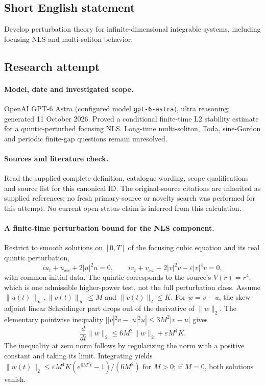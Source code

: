 \documentclass[11pt]{article}
\begin{document}
\subsection{Short English statement}
Develop perturbation theory for infinite-dimensional integrable systems, including focusing NLS and multi-soliton behavior.
\subsection{Research attempt}
\paragraph{Model, date and investigated scope.}
OpenAI GPT-6 Astra (configured model \texttt{gpt-6-astra}), ultra reasoning; generated 11 October 2026. Proved a conditional finite-time L2 stability estimate for a quintic-perturbed focusing NLS. Long-time multi-soliton, Toda, sine-Gordon and periodic finite-gap questions remain unresolved.

\paragraph{Sources and literature check.}
Read the supplied complete definition, catalogue wording, scope qualifications and source list for this canonical ID. The original-source citations are inherited as supplied references; no fresh primary-source or novelty search was performed for this attempt. No current open-status claim is inferred from this calculation.

\paragraph{A finite-time perturbation bound for the NLS component.}Restrict to smooth solutions on \([0,T]\) of the focusing cubic equation and its real quintic perturbation,
\[iu_t+u_{xx}+2|u|^2u=0,\qquad iv_t+v_{xx}+2|v|^2v-\varepsilon|v|^4v=0,
\]
with common initial data. The quintic corresponds to the source's \(V(r)=r^4\), which is one admissible higher-power test, not the full perturbation class. Assume \(\|u(t)\|_\infty,\|v(t)\|_\infty\le M\) and \(\|v(t)\|_2\le K\). For \(w=v-u\), the skew-adjoint linear Schrödinger part drops out of the derivative of \(\|w\|_2\). The elementary pointwise inequality \(||v|^2v-|u|^2u|\le3M^2|v-u|\) gives
\[\frac{d}{dt}\|w\|_2\le6M^2\|w\|_2+\varepsilon M^4K.
\]
The inequality at zero norm follows by regularizing the norm with a positive constant and taking its limit. Integrating yields \(\|w(t)\|_2\le\varepsilon M^4K(e^{6M^2t}-1)/(6M^2)\) for \(M>0\); if \(M=0\), both solutions vanish.
\end{document}
